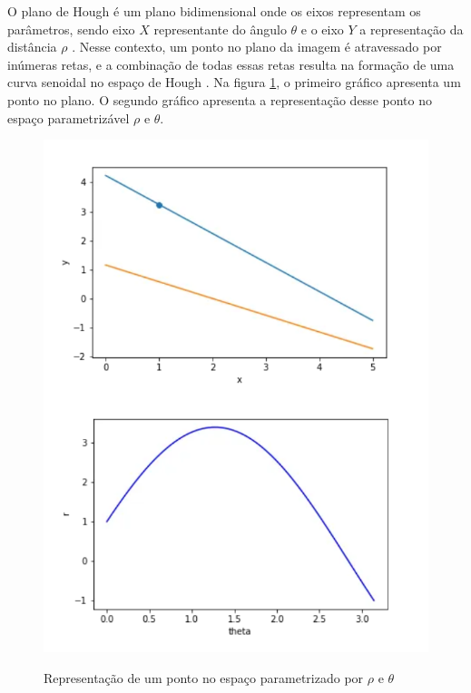 O plano de Hough é um plano bidimensional onde os eixos representam os parâmetros, sendo eixo $X$ representante do ângulo $\theta$ e o eixo $Y$ a representação da distância $\rho$ \cite{transformadaHough1}. Nesse contexto, um ponto no plano da imagem é atravessado por inúmeras retas, e a combinação de todas essas retas resulta na formação de uma curva senoidal no espaço de Hough \cite{detectBar}. Na figura \ref{fig:Representacao de um ponto no espaco parametrizavel}, o primeiro gráfico apresenta um ponto no plano. O segundo gráfico apresenta a representação desse ponto no espaço parametrizável $\rho$ e $\theta$.

\begin{figure}[H]
	\centering
    \caption{Representação de um ponto no espaço parametrizado por $\rho$ e $\theta$}
	\includegraphics[scale=0.5]{figuras/math/pontoEspacoParametrizavel.png}
	\label{fig:Representacao de um ponto no espaco parametrizavel}
\end{figure}

